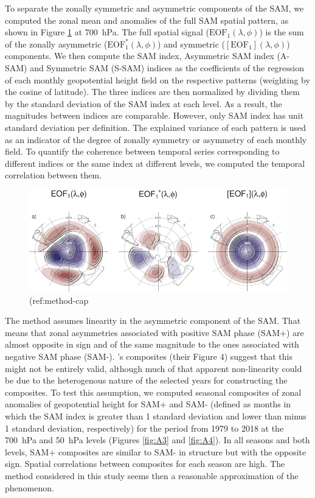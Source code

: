 \documentclass[smallextended]{svjour3}       %
\begin{document}
To separate the zonally symmetric and asymmetric components of the SAM, we computed the zonal mean and anomalies of the full SAM spatial pattern, as shown in Figure \ref{fig:method} at 700~hPa.
The full spatial signal (\(\mathrm{EOF_1}(\lambda, \phi)\)) is the sum of the zonally asymmetric (\(\mathrm{EOF_1^*}(\lambda, \phi)\)) and symmetric (\([\mathrm{EOF_1}](\lambda, \phi)\)) components.
We then compute the SAM index, Asymmetric SAM index (A\nobreakdash-SAM) and Symmetric SAM (S\nobreakdash-SAM) indices as the coefficients of the regression of each monthly geopotential height field on the respective patterns (weighting by the cosine of latitude).
The three indices are then normalized by dividing them by the standard deviation of the SAM index at each level.
As a result, the magnitudes between indices are comparable.
However, only SAM index has unit standard deviation per definition.
The explained variance of each pattern is used as an indicator of the degree of zonally symmetry or asymmetry of each monthly field.
To quantify the coherence between temporal series corresponding to different indices or the same index at different levels, we computed the temporal correlation between them.



\begin{figure}
\includegraphics{method-1} \caption{(ref:method-cap}\label{fig:method}
\end{figure}

The method assumes linearity in the asymmetric component of the SAM.
That means that zonal asymmetries associated with positive SAM phase (SAM+) are almost opposite in sign and of the same magnitude to the ones associated with negative SAM phase (SAM-).
\citet{fogt2012}'s composites (their Figure 4) suggest that this might not be entirely valid, although much of that apparent non-linearity could be due to the heterogenous nature of the selected years for constructing the composites.
To test this assumption, we computed seasonal composites of zonal anomalies of geopotential height for SAM+ and SAM- (defined as months in which the SAM index is greater than 1 standard deviation and lower than minus 1 standard deviation, respectively) for the period from 1979 to 2018 at the 700~hPa and 50~hPa levels (Figures \ref{fig:A3} and \ref{fig:A4}).
In all seasons and both levels, SAM+ composites are similar to SAM- in structure but with the opposite sign.
Spatial correlations between composites for each season are high.
The method considered in this study seems then a reasonable approximation of the phenomenon.
\end{document}
